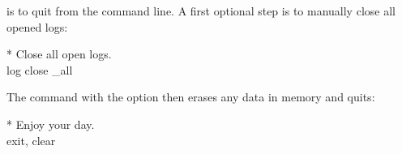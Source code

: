  is to quit from the command line. A first optional step is to manually close all opened logs:%

\begin{docspec}
	* Close all open logs.\\%
	log close \_all
\end{docspec}

The  command with the  option then erases any data in memory and quits:%

\begin{docspec}
	* Enjoy your day.\\%
	exit, clear
\end{docspec}
